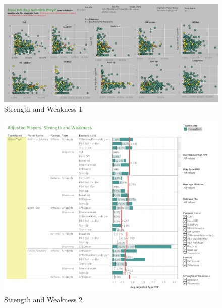 \documentclass[conference]{IEEEtran}
\begin{document}
\begin{figure}
  \includegraphics[width=\linewidth]{Strength_Weakness.jpg}
  \caption{Strength and Weakness 1}
  \vspace{-1mm}
  \label{fig:S-and-W-1}
\end{figure}

\begin{figure}
  \includegraphics[width=\linewidth]{Strength_Weakness_2.jpg}
  \caption{Strength and Weakness 2}
  \vspace{-1mm}
  \label{fig:S-and-W-2}
\end{figure}
\end{document}
